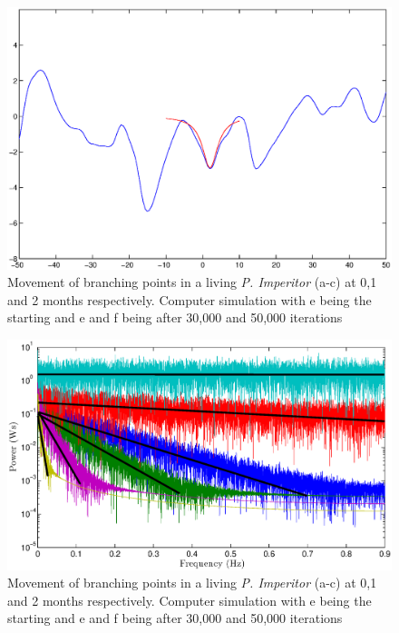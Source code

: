 \documentclass[]{article}
\begin{document}
\begin{figure}
\centering
\includegraphics[width=\textwidth]{lorentzianOnLandscape.eps}
\caption{Movement of branching points in a living \emph{P. Imperitor} (a-c) at 0,1 and 2 months respectively.
Computer simulation with e being the starting and e and f being after 30,000 and 50,000 iterations \label{branching}}
\end{figure}

\begin{figure}
\centering
\includegraphics[width=\textwidth]{Fourier_plots_with_varying_d.eps}
\caption{Movement of branching points in a living \emph{P. Imperitor} (a-c) at 0,1 and 2 months respectively.
Computer simulation with e being the starting and e and f being after 30,000 and 50,000 iterations \label{branching}}
\end{figure}
\end{document}
